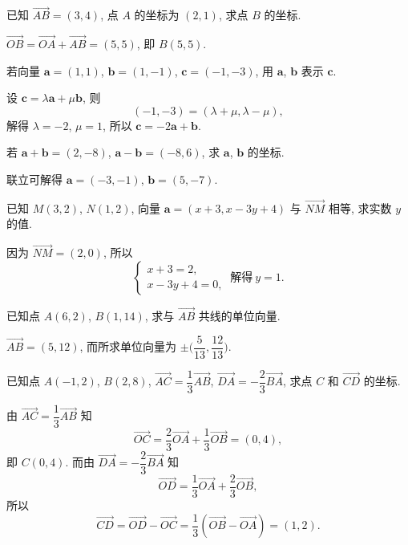 \begin{exercise}
    已知 $\overrightarrow{AB}=(3,4)$, 点 $A$ 的坐标为 $(2,1)$, 求点 $B$ 的坐标.
\end{exercise}
\beginsolution
    $\overrightarrow{OB}= \overrightarrow{OA}+ \overrightarrow{AB}= (5,5)$, 即 $B(5,5)$.
\endsolution

\begin{exercise}
    若向量 $\bm{a}=(1,1)$, $\bm{b}=(1,-1)$, $\bm{c}=(-1,-3)$, 
    用 $\bm{a}$, $\bm{b}$ 表示 $\bm{c}$.
\end{exercise}
\beginsolution
    设 $\bm{c}= \lambda\bm{a}+ \mu\bm{b}$, 则
    \[(-1,-3)= (\lambda+\mu,\lambda-\mu),\]
    解得 $\lambda= -2$, $\mu=1$, 所以 $\bm{c}= -2\bm{a}+ \bm{b}$.
\endsolution

\begin{exercise}
    若 $\bm{a}+\bm{b}=(2,-8)$, $\bm{a}-\bm{b}=(-8,6)$, 求 $\bm{a}$, $\bm{b}$ 的坐标.
\end{exercise}
\beginsolution
    联立可解得 $\bm{a}= (-3,-1)$, $\bm{b}= (5,-7)$.
\endsolution

\begin{exercise}
    已知 $M(3,2)$, $N(1,2)$, 向量 $\bm{a}=(x+3,x-3y+4)$ 与 $\overrightarrow{NM}$ 相等, 求实数 $y$ 的值.
\end{exercise}
\beginsolution
    因为 $\overrightarrow{NM}= (2,0)$, 所以
    \[\left\{\!\!\begin{array}{l}
        x+3= 2,\\
        x-3y+4= 0,
    \end{array}\right.\ \text{解得}\ y=1.\]
\endsolution

\begin{exercise}
    已知点 $A(6,2)$, $B(1,14)$, 求与 $\overrightarrow{AB}$ 共线的单位向量.
\end{exercise}
\beginsolution
    $\overrightarrow{AB}= (5,12)$, 而所求单位向量为 $\pm\biggl(\dfrac5{13}, \dfrac{12}{13}\biggr)$.
\endsolution

\begin{exercise}
    已知点 $A(-1,2)$, $B(2,8)$, $\overrightarrow{AC}= \dfrac13\overrightarrow{AB}$, $\overrightarrow{DA}= -\dfrac23\overrightarrow{BA}$, 求点 $C$ 和 $\overrightarrow{CD}$ 的坐标.
\end{exercise}
\beginsolution
    由 $\overrightarrow{AC}= \dfrac13\overrightarrow{AB}$ 知
    \[\overrightarrow{OC}
        = \frac23\overrightarrow{OA}+ \frac13\overrightarrow{OB}
        = (0,4),\]
    即 $C(0,4)$. 而由 $\overrightarrow{DA}= -\dfrac23\overrightarrow{BA}$ 知
    \[\overrightarrow{OD}
        = \frac13\overrightarrow{OA}+ \frac23\overrightarrow{OB},\]
    所以
    \[\overrightarrow{CD}
        = \overrightarrow{OD}- \overrightarrow{OC}
        = \frac13(\overrightarrow{OB}- \overrightarrow{OA})
        = (1,2).\]
\endsolution

